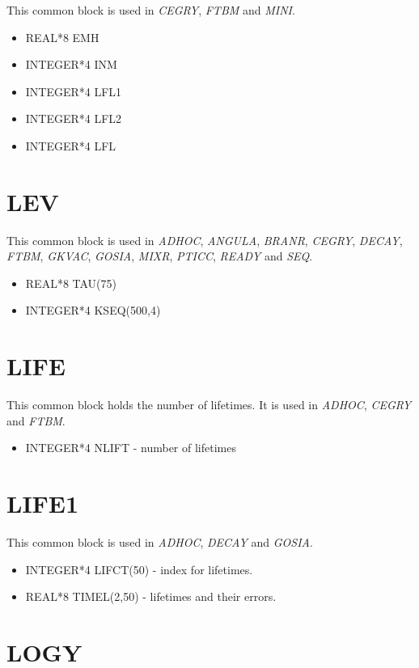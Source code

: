 This common block is used in {\em CEGRY}, {\em FTBM} and {\em MINI}.

\begin{itemize}
\item REAL*8 EMH
\item INTEGER*4 INM
\item INTEGER*4 LFL1
\item INTEGER*4 LFL2
\item INTEGER*4 LFL
\end{itemize}

\section{LEV}

This common block is used in {\em ADHOC}, {\em ANGULA}, {\em BRANR}, {\em
CEGRY}, {\em DECAY}, {\em FTBM}, {\em GKVAC}, {\em GOSIA}, {\em MIXR}, {\em
PTICC}, {\em READY} and {\em SEQ}.

\begin{itemize}
\item REAL*8 TAU(75)
\item INTEGER*4 KSEQ(500,4)
\end{itemize}

\section{LIFE}

This common block holds the number of lifetimes. It is used in {\em ADHOC},
{\em CEGRY} and {\em FTBM}.

\begin{itemize}
\item INTEGER*4 NLIFT - number of lifetimes
\end{itemize}

\section{LIFE1}

This common block is used in {\em ADHOC}, {\em DECAY} and {\em GOSIA}.

\begin{itemize}
\item INTEGER*4 LIFCT(50) - index for lifetimes.
\item REAL*8 TIMEL(2,50) - lifetimes and their errors.
\end{itemize}

\section{LOGY}

